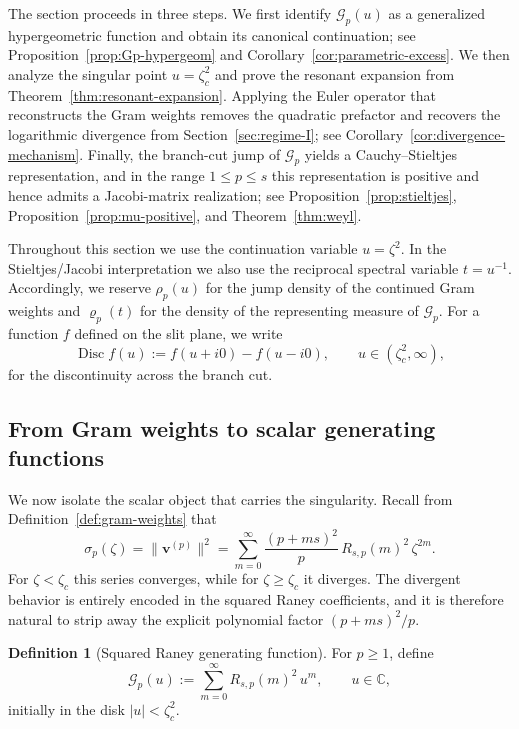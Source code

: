 \documentclass[11pt]{amsart}
\numberwithin{equation}{section}
\theoremstyle{plain}
\theoremstyle{definition}
\newtheorem{definition}[theorem]{Definition}
\theoremstyle{remark}
\newcommand{\CC}{\mathbb{C}}
\DeclareMathOperator{\Disc}{Disc}
\begin{document}
The section proceeds in three steps. We first identify \(\mathcal G_p(u)\) as a
generalized hypergeometric function and obtain its canonical continuation;
see Proposition~\ref{prop:Gp-hypergeom} and
Corollary~\ref{cor:parametric-excess}. We then analyze the singular point
\(u=\zeta_c^2\) and prove the resonant expansion from
Theorem~\ref{thm:resonant-expansion}. Applying the Euler operator that
reconstructs the Gram weights removes the quadratic prefactor and recovers
the logarithmic divergence from Section~\ref{sec:regime-I}; see
Corollary~\ref{cor:divergence-mechanism}. Finally, the branch-cut jump of
\(\mathcal G_p\) yields a Cauchy--Stieltjes representation, and in the range
\(1\le p\le s\) this representation is positive and hence admits a
Jacobi-matrix realization; see Proposition~\ref{prop:stieltjes},
Proposition~\ref{prop:mu-positive}, and Theorem~\ref{thm:weyl}.

Throughout this section we use the continuation variable \(u=\zeta^2\). In
the Stieltjes/Jacobi interpretation we also use the reciprocal spectral
variable \(t=u^{-1}\). Accordingly, we reserve \(\rho_p(u)\) for the jump
density of the continued Gram weights and \(\varrho_p(t)\) for the
density of the representing measure of \(\mathcal G_p\). For a function
\(f\) defined on the slit plane, we write
\[
	\Disc f(u):=f(u+i0)-f(u-i0),
	\qquad
	u\in(\zeta_c^2,\infty),
\]
for the discontinuity across the branch cut.

\subsection{From Gram weights to scalar generating functions}
\label{subsec:gram-to-gf}

We now isolate the scalar object that carries the singularity. Recall from
Definition~\ref{def:gram-weights} that
\begin{equation}\label{eq:sigma-p-recall}
	\sigma_p(\zeta)
	=
	\|\bm v^{(p)}\|^2
	=
	\sum_{m=0}^{\infty}
	\frac{(p+ms)^2}{p}\,R_{s,p}(m)^2\,\zeta^{2m}.
\end{equation}
For \(\zeta<\zeta_c\) this series converges, while for
\(\zeta\ge\zeta_c\) it diverges. The divergent behavior is entirely encoded
in the squared Raney coefficients, and it is therefore natural to strip away
the explicit polynomial factor \((p+ms)^2/p\).

\begin{definition}[Squared Raney generating function]
	\label{def:Gp}
	For \(p\ge1\), define
	\begin{equation}\label{eq:Gp-def}
		\mathcal G_p(u)
		:=
		\sum_{m=0}^{\infty}R_{s,p}(m)^2\,u^m,
		\qquad
		u\in\CC,
	\end{equation}
	initially in the disk \(|u|<\zeta_c^2\).
\end{definition}
\end{document}
